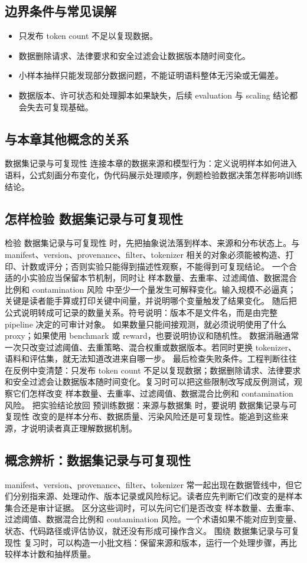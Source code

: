 \documentclass[a4paper]{article}
\begin{document}
\subsection{边界条件与常见误解}
\begin{itemize}
\item 只发布 token count 不足以复现数据。
\item 数据删除请求、法律要求和安全过滤会让数据版本随时间变化。
\item 小样本抽样只能发现部分数据问题，不能证明语料整体无污染或无偏差。
\item 数据版本、许可状态和处理脚本如果缺失，后续 evaluation 与 scaling 结论都会失去可复现基础。
\end{itemize}
\subsection{与本章其他概念的关系}
数据集记录与可复现性 连接本章的数据来源和模型行为：定义说明样本如何进入语料，公式刻画分布变化，伪代码展示处理顺序，例题检验数据决策怎样影响训练结论。
\subsection{怎样检验 数据集记录与可复现性}
检验 数据集记录与可复现性 时，先把抽象说法落到样本、来源和分布状态上。与 manifest、version、provenance、filter、tokenizer 相关的对象必须能被构造、打印、计数或评分；否则实验只能得到描述性观察，不能得到可复现结论。
一个合适的小实验应当保留本节机制，同时让 样本数量、去重率、过滤阈值、数据混合比例和 contamination 风险 中至少一个量发生可解释变化。输入规模不必逼真；关键是读者能手算或打印关键中间量，并说明哪个变量触发了结果变化。
随后把公式说明转成可记录的数量关系。符号说明：版本不是文件名，而是由完整 pipeline 决定的可审计对象。 如果数量只能间接观测，就必须说明使用了什么 proxy；如果使用 benchmark 或 reward，也要说明协议和随机性。
数据消融通常一次只改变过滤阈值、去重策略、混合权重或数据版本。若同时更换 tokenizer、语料和评估集，就无法知道改进来自哪一步。
最后检查失败条件。工程判断往往在反例中变清楚：只发布 token count 不足以复现数据；数据删除请求、法律要求和安全过滤会让数据版本随时间变化。复习时可以把这些限制改写成反例测试，观察它们怎样改变 样本数量、去重率、过滤阈值、数据混合比例和 contamination 风险。
把实验结论放回 预训练数据：来源与数据集 时，要说明 数据集记录与可复现性 改变的是样本分布、数据质量、污染风险还是可复现性。能追到这些来源，才说明读者真正理解数据机制。
\subsection{概念辨析：数据集记录与可复现性}
manifest、version、provenance、filter、tokenizer 常一起出现在数据管线中，但它们分别指来源、处理动作、版本记录或风险标记。读者应先判断它们改变的是样本集合还是审计证据。
区分这些词时，可以先问它们是否改变 样本数量、去重率、过滤阈值、数据混合比例和 contamination 风险。一个术语如果不能对应到变量、状态、代码路径或评估协议，就还没有形成可操作含义。
围绕 数据集记录与可复现性 复习时，可以构造一小批文档：保留来源和版本，运行一个处理步骤，再比较样本计数和抽样质量。
\end{document}

